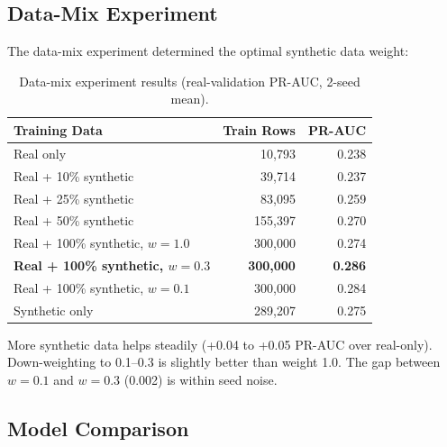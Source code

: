 \documentclass[12pt,a4paper]{article}
\begin{document}
\subsection{Data-Mix Experiment}

The data-mix experiment determined the optimal synthetic data weight:

\begin{table}[H]
\centering
\caption{Data-mix experiment results (real-validation PR-AUC, 2-seed mean).}
\label{tab:datamix}
\begin{tabular}{@{}lrr@{}}
\toprule
\textbf{Training Data} & \textbf{Train Rows} & \textbf{PR-AUC} \\
\midrule
Real only                      & 10,793  & 0.238 \\
Real + 10\% synthetic          & 39,714  & 0.237 \\
Real + 25\% synthetic          & 83,095  & 0.259 \\
Real + 50\% synthetic          & 155,397 & 0.270 \\
Real + 100\% synthetic, $w=1.0$  & 300,000 & 0.274 \\
\textbf{Real + 100\% synthetic, $w=0.3$} & \textbf{300,000} & \textbf{0.286} \\
Real + 100\% synthetic, $w=0.1$  & 300,000 & 0.284 \\
Synthetic only                 & 289,207 & 0.275 \\
\bottomrule
\end{tabular}
\end{table}

More synthetic data helps steadily (+0.04 to +0.05 PR-AUC over real-only).  Down-weighting to 0.1--0.3 is slightly better than weight 1.0.  The gap between $w = 0.1$ and $w = 0.3$ (0.002) is within seed noise.

\subsection{Model Comparison}
\end{document}
